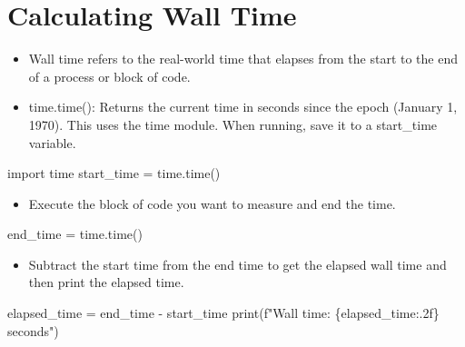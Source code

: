 \documentclass[
  letterpaper,
  DIV=11,
  numbers=noendperiod]{scrreprt}
\newenvironment{Shaded}{\begin{snugshade}}{\end{snugshade}}
\newcommand{\BuiltInTok}[1]{\textcolor[rgb]{0.00,0.23,0.31}{#1}}
\newcommand{\ImportTok}[1]{\textcolor[rgb]{0.00,0.46,0.62}{#1}}
\newcommand{\NormalTok}[1]{\textcolor[rgb]{0.00,0.23,0.31}{#1}}
\newcommand{\OperatorTok}[1]{\textcolor[rgb]{0.37,0.37,0.37}{#1}}
\newcommand{\SpecialCharTok}[1]{\textcolor[rgb]{0.37,0.37,0.37}{#1}}
\newcommand{\SpecialStringTok}[1]{\textcolor[rgb]{0.13,0.47,0.30}{#1}}
\providecommand{\tightlist}{%
  \setlength{\itemsep}{0pt}\setlength{\parskip}{0pt}}\usepackage{longtable,booktabs,array}
\begin{document}

\chapter{Calculating Wall Time}\label{calculating-wall-time}

\begin{itemize}
\tightlist
\item
  Wall time refers to the real-world time that elapses from the start to
  the end of a process or block of code.
\item
  time.time(): Returns the current time in seconds since the epoch
  (January 1, 1970). This uses the time module. When running, save it to
  a start\_time variable.
\end{itemize}

\begin{Shaded}
\begin{Highlighting}[]
\ImportTok{import}\NormalTok{ time}
\NormalTok{start\_time }\OperatorTok{=}\NormalTok{ time.time()}
\end{Highlighting}
\end{Shaded}

\begin{itemize}
\tightlist
\item
  Execute the block of code you want to measure and end the time.
\end{itemize}

\begin{Shaded}
\begin{Highlighting}[]
\NormalTok{end\_time }\OperatorTok{=}\NormalTok{ time.time()}
\end{Highlighting}
\end{Shaded}

\begin{itemize}
\tightlist
\item
  Subtract the start time from the end time to get the elapsed wall time
  and then print the elapsed time.
\end{itemize}

\begin{Shaded}
\begin{Highlighting}[]
\NormalTok{elapsed\_time }\OperatorTok{=}\NormalTok{ end\_time }\OperatorTok{{-}}\NormalTok{ start\_time}
\BuiltInTok{print}\NormalTok{(}\SpecialStringTok{f"Wall time: }\SpecialCharTok{\{}\NormalTok{elapsed\_time}\SpecialCharTok{:.2f\}}\SpecialStringTok{ seconds"}\NormalTok{)}
\end{Highlighting}
\end{Shaded}
\end{document}
